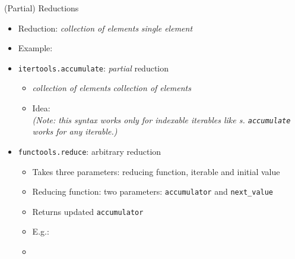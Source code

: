 \begin{frame}{(Partial) Reductions}
%
\begin{itemize}
\item Reduction: \emph{collection of elements} \thus \emph{single element}
\item Example: 
\item \texttt{itertools.accumulate}: \emph{partial} reduction
	\begin{itemize}
	\item \emph{collection of elements} \thus \emph{collection of elements}
	\item Idea: \\
		\emph{(Note: this syntax works only for indexable iterables like s. \texttt{accumulate} works for any iterable.)}
	\end{itemize}
\item \texttt{functools.reduce}: arbitrary reduction
	\begin{itemize}
	\item Takes three parameters: reducing function, iterable and initial value
	\item Reducing function: two parameters: \texttt{accumulator} and \texttt{next\_value}
	\item Returns updated \texttt{accumulator}
	\item E.\;g.: 
	\item {}
	\end{itemize}
\end{itemize}
%
\end{frame}


